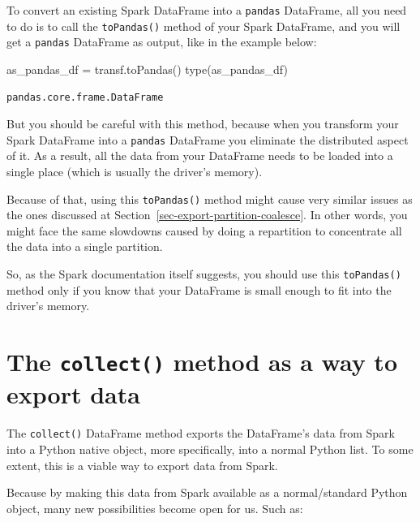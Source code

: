 \documentclass[
  11pt,
  letterpaper,
  DIV=11,
  numbers=noendperiod]{scrreprt}
\newenvironment{Shaded}{\begin{snugshade}}{\end{snugshade}}
\newcommand{\BuiltInTok}[1]{\textcolor[rgb]{0.00,0.23,0.31}{#1}}
\newcommand{\NormalTok}[1]{\textcolor[rgb]{0.00,0.23,0.31}{#1}}
\newcommand{\OperatorTok}[1]{\textcolor[rgb]{0.37,0.37,0.37}{#1}}
\begin{document}
To convert an existing Spark DataFrame into a \texttt{pandas} DataFrame,
all you need to do is to call the \texttt{toPandas()} method of your
Spark DataFrame, and you will get a \texttt{pandas} DataFrame as output,
like in the example below:

\begin{Shaded}
\begin{Highlighting}[]
\NormalTok{as\_pandas\_df }\OperatorTok{=}\NormalTok{ transf.toPandas()}
\BuiltInTok{type}\NormalTok{(as\_pandas\_df)}
\end{Highlighting}
\end{Shaded}

\begin{verbatim}
pandas.core.frame.DataFrame
\end{verbatim}

But you should be careful with this method, because when you transform
your Spark DataFrame into a \texttt{pandas} DataFrame you eliminate the
distributed aspect of it. As a result, all the data from your DataFrame
needs to be loaded into a single place (which is usually the driver's
memory).

Because of that, using this \texttt{toPandas()} method might cause very
similar issues as the ones discussed at
Section~\ref{sec-export-partition-coalesce}. In other words, you might
face the same slowdowns caused by doing a repartition to concentrate all
the data into a single partition.

So, as the Spark documentation itself suggests, you should use this
\texttt{toPandas()} method only if you know that your DataFrame is small
enough to fit into the driver's memory.

\hypertarget{the-collect-method-as-a-way-to-export-data}{%
\section{\texorpdfstring{The \texttt{collect()} method as a way to
export
data}{The collect() method as a way to export data}}\label{the-collect-method-as-a-way-to-export-data}}

The \texttt{collect()} DataFrame method exports the DataFrame's data
from Spark into a Python native object, more specifically, into a normal
Python list. To some extent, this is a viable way to export data from
Spark.

Because by making this data from Spark available as a normal/standard
Python object, many new possibilities become open for us. Such as:
\end{document}
